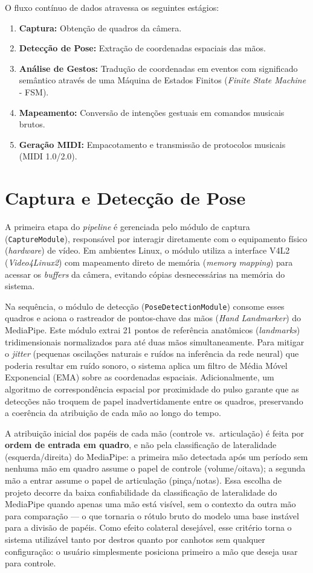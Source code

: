 O fluxo contínuo de dados atravessa os seguintes estágios:
\begin{enumerate}
    \item \textbf{Captura:} Obtenção de quadros da câmera.
    \item \textbf{Detecção de Pose:} Extração de coordenadas espaciais das mãos.
    \item \textbf{Análise de Gestos:} Tradução de coordenadas em eventos com significado semântico através de uma Máquina de Estados Finitos (\textit{Finite State Machine} - FSM).
    \item \textbf{Mapeamento:} Conversão de intenções gestuais em comandos musicais brutos.
    \item \textbf{Geração MIDI:} Empacotamento e transmissão de protocolos musicais (MIDI 1.0/2.0).
\end{enumerate}

\section{Captura e Detecção de Pose}
\label{sec:captura_deteccao}

A primeira etapa do \textit{pipeline} é gerenciada pelo módulo de captura (\texttt{CaptureModule}), responsável por interagir diretamente com o equipamento físico (\textit{hardware}) de vídeo. Em ambientes Linux, o módulo utiliza a interface V4L2 (\textit{Video4Linux2}) com mapeamento direto de memória (\textit{memory mapping}) para acessar os \textit{buffers} da câmera, evitando cópias desnecessárias na memória do sistema. 

Na sequência, o módulo de detecção (\texttt{PoseDetectionModule}) consome esses quadros e aciona o rastreador de pontos-chave das mãos (\textit{Hand Landmarker}) do MediaPipe. Este módulo extrai 21 pontos de referência anatômicos (\textit{landmarks}) tridimensionais normalizados para até duas mãos simultaneamente. Para mitigar o \textit{jitter} (pequenas oscilações naturais e ruídos na inferência da rede neural) que poderia resultar em ruído sonoro, o sistema aplica um filtro de Média Móvel Exponencial (EMA) sobre as coordenadas espaciais. Adicionalmente, um algoritmo de correspondência espacial por proximidade do pulso garante que as detecções não troquem de papel inadvertidamente entre os quadros, preservando a coerência da atribuição de cada mão ao longo do tempo.

A atribuição inicial dos papéis de cada mão (controle vs.\ articulação) é feita por \textbf{ordem de entrada em quadro}, e não pela classificação de lateralidade (esquerda/direita) do MediaPipe: a primeira mão detectada após um período sem nenhuma mão em quadro assume o papel de controle (volume/oitava); a segunda mão a entrar assume o papel de articulação (pinça/notas). Essa escolha de projeto decorre da baixa confiabilidade da classificação de lateralidade do MediaPipe quando apenas uma mão está visível, sem o contexto da outra mão para comparação — o que tornaria o rótulo bruto do modelo uma base instável para a divisão de papéis. Como efeito colateral desejável, esse critério torna o sistema utilizável tanto por destros quanto por canhotos sem qualquer configuração: o usuário simplesmente posiciona primeiro a mão que deseja usar para controle.

